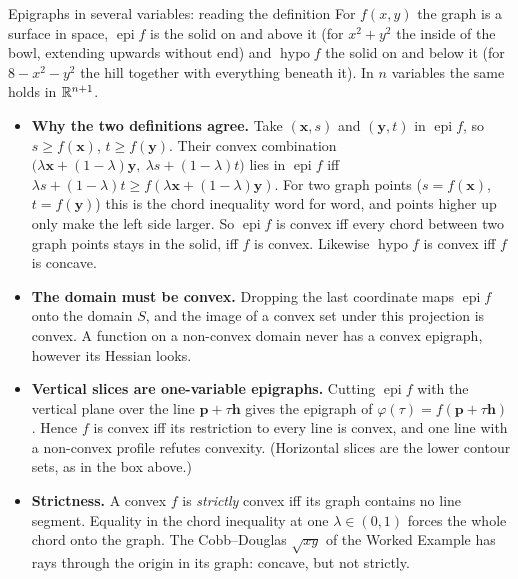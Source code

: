 \begin{rulebox}{Epigraphs in several variables: reading the definition}
For $f(x,y)$ the graph is a surface in space, $\operatorname{epi}f$ is the
solid on and above it (for $x^{2}+y^{2}$ the inside of the bowl, extending
upwards without end) and $\operatorname{hypo}f$ the solid on and below it (for
$8-x^{2}-y^{2}$ the hill together with everything beneath it). In $n$
variables the same holds in $\mathbb{R}^{n+1}$.
\begin{itemize}[leftmargin=1.6em,itemsep=0.3ex]
  \item \textbf{Why the two definitions agree.} Take
        $(\mathbf{x},s)$ and $(\mathbf{y},t)$ in $\operatorname{epi}f$, so
        $s\ge f(\mathbf{x})$, $t\ge f(\mathbf{y})$. Their convex combination
        $\bigl(\lambda\mathbf{x}+(1-\lambda)\mathbf{y},\
        \lambda s+(1-\lambda)t\bigr)$ lies in $\operatorname{epi}f$ iff
        $\lambda s+(1-\lambda)t\ge f(\lambda\mathbf{x}+(1-\lambda)\mathbf{y})$.
        For two graph points ($s=f(\mathbf{x})$, $t=f(\mathbf{y})$) this is
        the chord inequality word for word, and points higher up only make
        the left side larger. So $\operatorname{epi}f$ is convex iff every
        chord between two graph points stays in the solid, iff $f$ is
        convex. Likewise $\operatorname{hypo}f$ is convex iff $f$ is
        concave.
  \item \textbf{The domain must be convex.} Dropping the last coordinate
        maps $\operatorname{epi}f$ onto the domain $S$, and the image of a
        convex set under this projection is convex. A function on a
        non-convex domain never has a convex epigraph, however its Hessian
        looks.
  \item \textbf{Vertical slices are one-variable epigraphs.} Cutting
        $\operatorname{epi}f$ with the vertical plane over the line
        $\mathbf{p}+\tau\mathbf{h}$ gives the epigraph of
        $\varphi(\tau)=f(\mathbf{p}+\tau\mathbf{h})$. Hence $f$ is convex iff
        its restriction to every line is convex, and one line with a
        non-convex profile refutes convexity. (Horizontal slices are the
        lower contour sets, as in the box above.)
  \item \textbf{Strictness.} A convex $f$ is \emph{strictly} convex iff its
        graph contains no line segment. Equality in the chord inequality at
        one $\lambda\in(0,1)$ forces the whole chord onto the graph. The
        Cobb--Douglas $\sqrt{xy}$ of the Worked Example has rays through
        the origin in its graph: concave, but not strictly.
\end{itemize}
\end{rulebox}

